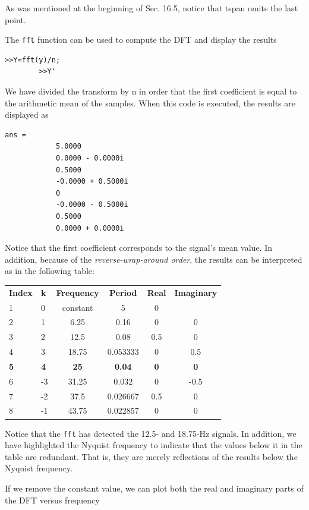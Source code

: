 \documentclass[../main.tex]{subfiles}
\begin{document}
\begin{example}
	\noindent As was mentioned at the beginning of Sec. 16.5, notice that tspan omits the last point.

	The \texttt{fft} function can be used to compute the DFT and display the results

	\begin{lstlisting}[numbers=none]
		>>Y=fft(y)/n;
		>>Y'
	\end{lstlisting}

	\noindent We have divided the transform by n in order that the first coefficient is equal to the arithmetic mean of the samples. When this code is executed, the results are displayed as

	\begin{lstlisting}[numbers=none]
		ans =
			5.0000
			0.0000 - 0.0000i
			0.5000
			-0.0000 + 0.5000i
			0
			-0.0000 - 0.5000i
			0.5000
			0.0000 + 0.0000i
	\end{lstlisting}

	\noindent Notice that the first coefficient corresponds to the signal's mean value. In addition, because of the \textit{reverse-wrap-around order}, the results can be interpreted as in the following
	table:

	\begin{tabular}{l l c c c c}
		\textbf{Index} & \textbf{k} & \textbf{Frequency} & \textbf{Period} & \textbf{Real} & \textbf{Imaginary} \\
		1 & 0 & constant & 5 & 0 \\
		2 & 1 & 6.25 & 0.16 & 0 & 0 \\
		3 & 2 & 12.5 & 0.08 & 0.5 & 0 \\
		4 & 3 & 18.75 & 0.053333 & 0 & 0.5 \\
		\textbf{5} & \textbf{4} & \textbf{25} & \textbf{0.04} & \textbf{0} & \textbf{0} \\
		6 & -3 & 31.25 & 0.032 & 0 & -0.5 \\
		7 & -2 & 37.5 & 0.026667 & 0.5 & 0 \\
		8 & -1 & 43.75 & 0.022857 & 0 & 0
	\end{tabular}

	\noindent Notice that the \texttt{fft} has detected the 12.5- and 18.75-Hz signals. In addition, we have highlighted the Nyquist frequency to indicate that the values below it in the table are redundant.
	That is, they are merely reflections of the results below the Nyquist frequency.

	If we remove the constant value, we can plot both the real and imaginary parts of the
DFT versus frequency


\end{example}
\end{document}
